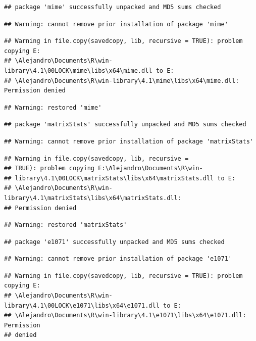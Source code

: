 \documentclass[
  10pt,
]{article}
\begin{document}
\begin{verbatim}
## package 'mime' successfully unpacked and MD5 sums checked
\end{verbatim}

\begin{verbatim}
## Warning: cannot remove prior installation of package 'mime'
\end{verbatim}

\begin{verbatim}
## Warning in file.copy(savedcopy, lib, recursive = TRUE): problem copying E:
## \Alejandro\Documents\R\win-library\4.1\00LOCK\mime\libs\x64\mime.dll to E:
## \Alejandro\Documents\R\win-library\4.1\mime\libs\x64\mime.dll: Permission denied
\end{verbatim}

\begin{verbatim}
## Warning: restored 'mime'
\end{verbatim}

\begin{verbatim}
## package 'matrixStats' successfully unpacked and MD5 sums checked
\end{verbatim}

\begin{verbatim}
## Warning: cannot remove prior installation of package 'matrixStats'
\end{verbatim}

\begin{verbatim}
## Warning in file.copy(savedcopy, lib, recursive =
## TRUE): problem copying E:\Alejandro\Documents\R\win-
## library\4.1\00LOCK\matrixStats\libs\x64\matrixStats.dll to E:
## \Alejandro\Documents\R\win-library\4.1\matrixStats\libs\x64\matrixStats.dll:
## Permission denied
\end{verbatim}

\begin{verbatim}
## Warning: restored 'matrixStats'
\end{verbatim}

\begin{verbatim}
## package 'e1071' successfully unpacked and MD5 sums checked
\end{verbatim}

\begin{verbatim}
## Warning: cannot remove prior installation of package 'e1071'
\end{verbatim}

\begin{verbatim}
## Warning in file.copy(savedcopy, lib, recursive = TRUE): problem copying E:
## \Alejandro\Documents\R\win-library\4.1\00LOCK\e1071\libs\x64\e1071.dll to E:
## \Alejandro\Documents\R\win-library\4.1\e1071\libs\x64\e1071.dll: Permission
## denied
\end{verbatim}
\end{document}

